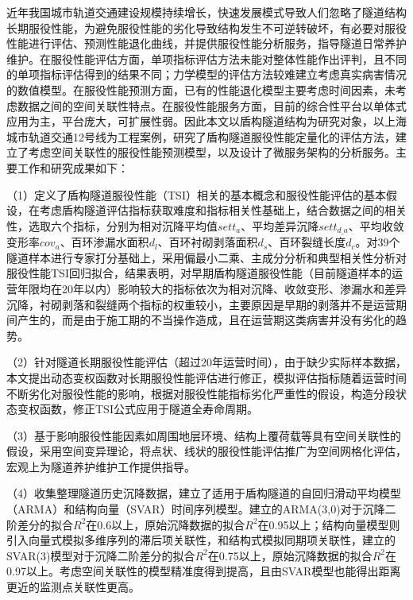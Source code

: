 
\begin{cabstract}

近年我国城市轨道交通建设规模持续增长，快速发展模式导致人们忽略了隧道结构长期服役性能，为避免服役性能的劣化导致结构发生不可逆转破坏，有必要对服役性能进行评估、预测性能退化曲线，并提供服役性能分析服务，指导隧道日常养护维护。在服役性能评估方面，单项指标评估方法未能对整体性能作出评判，且不同的单项指标评估得到的结果不同；力学模型的评估方法较难建立考虑真实病害情况的数值模型。在服役性能预测方面，已有的性能退化模型主要考虑时间因素，未考虑数据之间的空间关联性特点。在服役性能服务方面，目前的综合性平台以单体式应用为主，平台庞大，可扩展性弱。因此本文以盾构隧道结构为研究对象，以上海城市轨道交通12号线为工程案例，研究了盾构隧道服役性能定量化的评估方法，建立了考虑空间关联性的服役性能预测模型，以及设计了微服务架构的分析服务。主要工作和研究成果如下：

（1）定义了盾构隧道服役性能（TSI）相关的基本概念和服役性能评估的基本假设，在考虑盾构隧道评估指标获取难度和指标相关性基础上，结合数据之间的相关性，选取六个指标，分别为相对沉降平均值${sett}_{a}$、平均差异沉降$set{{t}_{d\_a}}$、平均收敛变形率${cov}_{a}$、百环渗漏水面积${d}_{l}$、百环衬砌剥落面积${d}_{s}$、百环裂缝长度${d}_{c}$。对39个隧道样本进行专家打分基础上，采用偏最小二乘、主成分分析和典型相关性分析对服役性能TSI回归拟合，结果表明，对早期盾构隧道服役性能（目前隧道样本的运营年限均在20年以内）影响较大的指标依次为相对沉降、收敛变形、渗漏水和差异沉降，衬砌剥落和裂缝两个指标的权重较小，主要原因是早期的剥落并不是运营期间产生的，而是由于施工期的不当操作造成，且在运营期这类病害并没有劣化的趋势。

（2）针对隧道长期服役性能评估（超过20年运营时间），由于缺少实际样本数据，本文提出动态变权函数对长期服役性能评估进行修正，模拟评估指标随着运营时间不断劣化对服役性能的影响，根据对服役性能指标劣化严重性的假设，构造分段状态变权函数，修正TSI公式应用于隧道全寿命周期。

（3）基于影响服役性能因素如周围地层环境、结构上覆荷载等具有空间关联性的假设，采用空间变异理论，将点状、线状的服役性能评估推广为空间网格化评估，宏观上为隧道养护维护工作提供指导。

（4）收集整理隧道历史沉降数据，建立了适用于盾构隧道的自回归滑动平均模型（ARMA）和结构向量（SVAR）时间序列模型。建立的ARMA(3,0)对于沉降二阶差分的拟合$R^2$在0.6以上，原始沉降数据的拟合$R^2$在0.95以上；结构向量模型则引入向量式模拟多维序列的滞后项关联性，和结构式模拟同期项关联性，建立的SVAR(3)模型对于沉降二阶差分的拟合$R^2$在0.75以上，原始沉降数据的拟合$R^2$在0.97以上。考虑空间关联性的模型精准度得到提高，且由SVAR模型也能得出距离更近的监测点关联性更高。


\end{cabstract}
